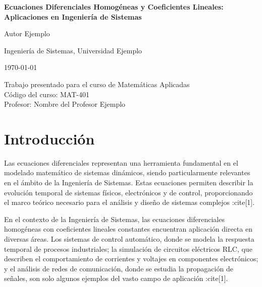\documentclass[12pt,a4paper]{article}
\begin{document}
\begin{titlepage}
    \centering
    \vspace*{2cm}
    
    {\LARGE \textbf{Ecuaciones Diferenciales Homogéneas y Coeficientes Lineales: Aplicaciones en Ingeniería de Sistemas}\par}
    
    \vspace{3cm}
    
    {\large Autor Ejemplo\par}
    \vspace{0.5cm}
    {\large Ingeniería de Sistemas, Universidad Ejemplo\par}
    
    \vspace{2cm}
    
    {\large \today\par}
    
    \vspace{3cm}
    
    \begin{flushleft}
        Trabajo presentado para el curso de Matemáticas Aplicadas\\
        Código del curso: MAT-401\\
        Profesor: Nombre del Profesor Ejemplo
    \end{flushleft}
    
    \vfill
\end{titlepage}

\setcounter{page}{2} %

\section{Introducción}
Las ecuaciones diferenciales representan una herramienta fundamental en el modelado matemático de sistemas dinámicos, siendo particularmente relevantes en el ámbito de la Ingeniería de Sistemas. Estas ecuaciones permiten describir la evolución temporal de sistemas físicos, electrónicos y de control, proporcionando el marco teórico necesario para el análisis y diseño de sistemas complejos :cite[1].

En el contexto de la Ingeniería de Sistemas, las ecuaciones diferenciales homogéneas con coeficientes lineales constantes encuentran aplicación directa en diversas áreas. Los sistemas de control automático, donde se modela la respuesta temporal de procesos industriales; la simulación de circuitos eléctricos RLC, que describen el comportamiento de corrientes y voltajes en componentes electrónicos; y el análisis de redes de comunicación, donde se estudia la propagación de señales, son solo algunos ejemplos del vasto campo de aplicación :cite[1].
\end{document}
